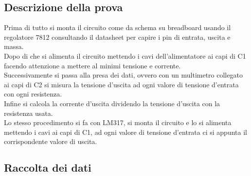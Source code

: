 \documentclass[12pt]{article}
\begin{document}
        \subsection{Descrizione della prova}
        Prima di tutto si monta il circuito come da schema su breadboard usando il regolatore 7812 consultando il 
        datasheet per capire i pin di entrata, uscita e massa.\\ Dopo di che si alimenta il circuito mettendo i cavi 
        dell'alimentatore ai capi di C1 facendo attenzione a mettere al minimi tensione e corrente.\\ Successivamente si 
        passa alla presa dei dati, ovvero con un multimetro collegato ai capi di C2 si misura la tensione d'uscita ad 
        ogni valore di tensione d'entrata con ogni resistenza.\\ Infine si calcola la corrente d'uscita dividendo la 
        tensione d'uscita con la resistenza usata.\\
        Lo stesso procedimento si fa con LM317, si monta il circuito e lo si alimenta mettendo i cavi ai capi di C1, 
        ad ogni valore di tensione d'entrata ci si appunta il corrispondente valore di uscita.\\
        \subsection{Raccolta dei dati}
    \noindent
        
\end{document}
